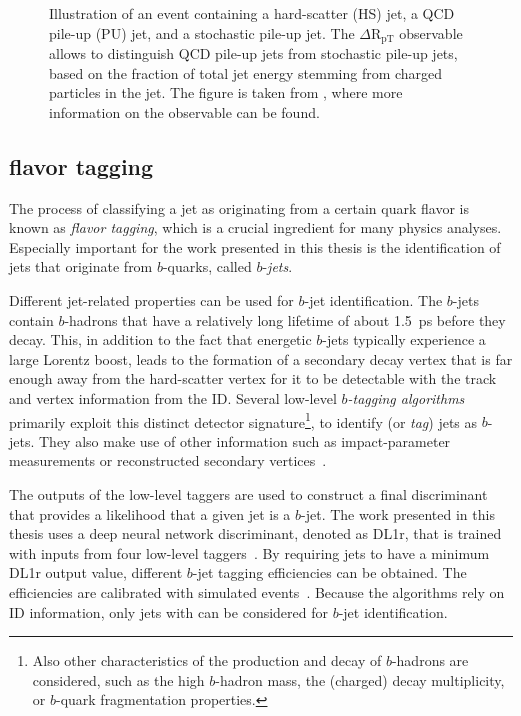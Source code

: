 \FloatBarrier
\begin{figure}[t]
    \caption{Illustration of an event containing a hard-scatter (HS) jet, a QCD pile-up (PU) jet, and a stochastic pile-up jet. The $\Delta \text{R}_{\text{pT}}$ observable allows to distinguish QCD pile-up jets from stochastic pile-up jets, based on the fraction of total jet energy stemming from charged particles in the jet. The figure is taken from , where more information on the observable can be found.}
    \label{fig:pile-up-jets-illustration}
\end{figure}


\subsection{flavor tagging}
The process of classifying a jet as originating from a certain quark flavor is known as \emph{flavor tagging}, which is a crucial ingredient for many physics analyses. Especially important for the work presented in this thesis is the identification of jets that originate from $b$-quarks, called $b$-\emph{jets}.

Different jet-related properties can be used for $b$-jet identification.
The $b$-jets contain $b$-hadrons that have a relatively long lifetime of about \SI{1.5}{\pico\second} before they decay. This, in addition to the fact that energetic $b$-jets typically experience a large Lorentz boost, leads to the formation of a secondary decay vertex that is far enough away from the hard-scatter vertex for it to be detectable with the track and vertex information from the ID.
Several low-level \emph{$b$-tagging algorithms} primarily exploit this distinct detector signature\footnote{Also other characteristics of the production and decay of $b$-hadrons are considered, such as the high $b$-hadron mass, the (charged) decay multiplicity, or $b$-quark fragmentation properties.}, to identify (or \emph{tag}) jets as $b$-jets. They also make use of other information such as impact-parameter measurements or reconstructed secondary vertices~\cite{ATL-PHYS-PUB-2017-013}.

The outputs of the low-level taggers are used to construct a final discriminant that provides a likelihood that a given jet is a $b$-jet. The work presented in this thesis uses a deep neural network discriminant, denoted as DL1r, that is trained with inputs from four low-level taggers~\cite{ATL-PHYS-PUB-2017-013}.
By requiring jets to have a minimum DL1r output value, different $b$-jet tagging efficiencies can be obtained. The efficiencies are calibrated with simulated \ttbar events~\cite{FTAG-2018-01}.
Because the algorithms rely on ID information, only jets with  can be considered for $b$-jet identification.



